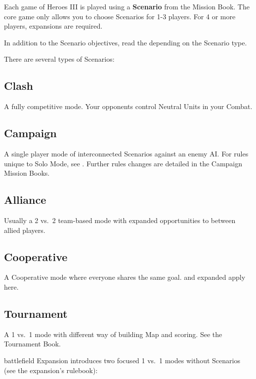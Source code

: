 
\begin{multicols*}{2}

Each game of Heroes III is played using a \textbf{Scenario} from the Mission Book.
The core game only allows you to choose Scenarios for 1-3 players. For 4 or more players, expansions are required.\par
In addition to the Scenario objectives, read the  depending on the Scenario type.\par
There are several types of Scenarios:

\subsection*{Clash}
A fully competitive mode.
Your opponents control Neutral Units in your Combat.

\subsection*{Campaign}
A single player mode of interconnected Scenarios against an enemy AI.
For rules unique to Solo Mode, see .
Further rules changes are detailed in the Campaign Mission Books.

\subsection*{Alliance}
Usually a 2 vs.~2 team-based mode with expanded opportunities to  between allied players.

\subsection*{Cooperative}
A Cooperative mode where everyone shares the same goal.  and expanded  apply here.

\subsection*{Tournament}
A 1 vs.~1 mode with different way of building Map and scoring. See the Tournament Book.

\columnbreak

\begin{expansion}[before=\vspace*{-10mm}]{battlefield}
 Expansion introduces two focused 1 vs.~1 modes without Scenarios (see the expansion's rulebook):


\end{expansion}
\end{multicols*}
